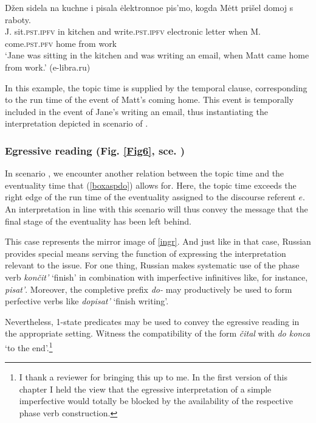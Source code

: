 \documentclass[output=paper,colorlinks,citecolor=brown]{langscibook}
\begin{document}
\ea\label{orlov1}
\gll Džen
sidela na  kuchne i pisala ėlektronnoe pis'mo, kogda Mėtt prišel domoj s raboty.\\
J. sit.\textsc{pst.ipfv} in 
kitchen and write.\textsc{pst.ipfv} electronic letter
when M. come.\textsc{pst.pfv} home from work\\
\glt `Jane was sitting in the kitchen and was writing an email, when Matt came home from work.' \hfill (e-libra.ru)
\z

\noindent In this example, the topic time is supplied by the temporal clause,  corresponding to the run time of the event of Matt's coming home. This event is temporally included in the event of Jane's writing an email, thus instantiating the interpretation depicted in scenario  of .

\subsubsection{Egressive reading (Fig. \ref{Fig6}, sce. )}\label{egr}
In scenario , we encounter another relation between the topic time and the eventuality time that (\ref{boxaspdo}) allows for. 
Here, the topic time exceeds the right edge of the run time of the eventuality assigned to the discourse referent $e$.
An interpretation in line with this scenario will thus convey the message that the final stage of the eventuality
has been left behind. 

This case represents the mirror image of \ref{ingr}. And just like in that case, Russian provides special means 
serving the function of expressing the interpretation relevant to the issue. 
For one thing, Russian makes systematic use of the phase verb \textit{končit'} `finish' in combination with
imperfective infinitives like, for instance, \textit{pisat'}. Moreover,
the completive prefix \textit{do-} may productively be used to form perfective verbs like \textit{dopisat'} `finish writing'.

Nevertheless, 1-state predicates may be used to convey the egressive reading in the appropriate setting. Witness the compatibility of the form \textit{čital} with \textit{do konca} `to the end'.\footnote{I thank a reviewer for bringing this up to me. In the first version of this chapter I held the view that the egressive interpretation of a simple imperfective would totally be blocked by the availability of the respective phase verb construction.}
\end{document}
